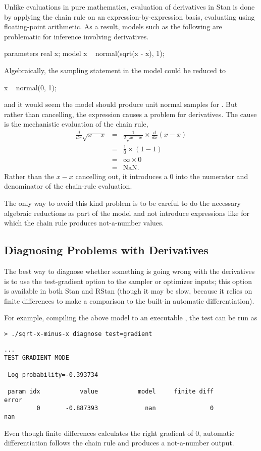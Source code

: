 Unlike evaluations in pure mathematics, evaluation of derivatives in
Stan is done by applying the chain rule on an expression-by-expression
basis, evaluating using floating-point arithmetic.  As a result,
models such as the following are problematic for inference involving
derivatives.
%
\begin{stancode}
parameters {
  real x;
}
model {
  x ~ normal(sqrt(x - x), 1);
}
\end{stancode}
%
Algebraically, the sampling statement in the model could be reduced to
%
\begin{stancode}
  x ~ normal(0, 1);
\end{stancode}
%
and it would seem the model should produce unit normal samples for
.  But rather than cancelling, the expression  causes a problem for derivatives.  The cause is the mechanistic
evaluation of the chain rule,
%
\begin{eqnarray*}
\frac{d}{dx} \sqrt{x - x}
& = &
\frac{1}{2 \sqrt{x - x}} \times \frac{d}{dx} (x - x)
\\[4pt]
& = &
\frac{1}{0} \times (1 - 1)
\\[4pt]
& = &
\infty \times 0
\\[4pt]
& = & \mbox{NaN}.
\end{eqnarray*}
%
Rather than the $x - x$ cancelling out, it introduces a 0 into the
numerator and denominator of the chain-rule evaluation.

The only way to avoid this kind problem is to be careful to do the
necessary algebraic reductions as part of the model and not introduce
expressions like  for which the chain rule produces
not-a-number values.

\subsection{Diagnosing Problems with Derivatives}

The best way to diagnose whether something is going wrong with the
derivatives is to use the test-gradient option to the sampler or
optimizer inputs; this option is available in both Stan and RStan
(though it may be slow, because it relies on finite differences to
make a comparison to the built-in automatic differentiation).

For example, compiling the above model to an executable
, the test can be run as
%
\begin{Verbatim}
> ./sqrt-x-minus-x diagnose test=gradient
\end{Verbatim}
\begin{Verbatim}[fontsize=\small]
...
TEST GRADIENT MODE

 Log probability=-0.393734

 param idx           value           model     finite diff           error
         0       -0.887393             nan               0             nan
\end{Verbatim}
%
Even though finite differences calculates the right gradient of 0,
automatic differentiation follows the chain rule and produces a
not-a-number output.



